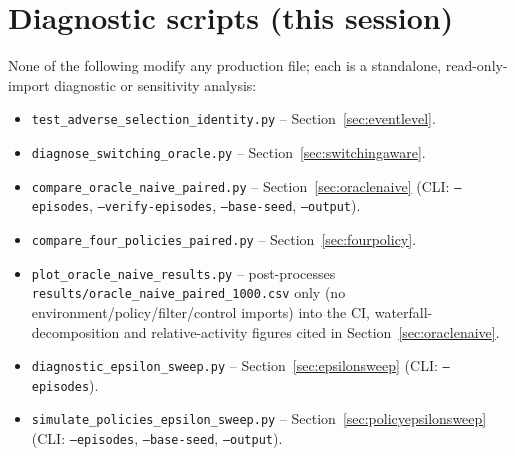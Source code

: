 \documentclass[11pt]{article}
\begin{document}
\section{Diagnostic scripts (this session)}
\label{sec:diagnosticscripts}
None of the following modify any production file; each is a standalone, read-only-import diagnostic or sensitivity analysis:
\begin{itemize}
\item \texttt{test\_adverse\_selection\_identity.py} -- Section~\ref{sec:eventlevel}.
\item \texttt{diagnose\_switching\_oracle.py} -- Section~\ref{sec:switchingaware}.
\item \texttt{compare\_oracle\_naive\_paired.py} -- Section~\ref{sec:oraclenaive} (CLI: \texttt{--episodes}, \texttt{--verify-episodes}, \texttt{--base-seed}, \texttt{--output}).
\item \texttt{compare\_four\_policies\_paired.py} -- Section~\ref{sec:fourpolicy}.
\item \texttt{plot\_oracle\_naive\_results.py} -- post-processes \texttt{results/oracle\_naive\_paired\_1000.csv} only (no environment/policy/filter/control imports) into the CI, waterfall-decomposition and relative-activity figures cited in Section~\ref{sec:oraclenaive}.
\item \texttt{diagnostic\_epsilon\_sweep.py} -- Section~\ref{sec:epsilonsweep} (CLI: \texttt{--episodes}).
\item \texttt{simulate\_policies\_epsilon\_sweep.py} -- Section~\ref{sec:policyepsilonsweep} (CLI: \texttt{--episodes}, \texttt{--base-seed}, \texttt{--output}).
\end{itemize}
\end{document}
